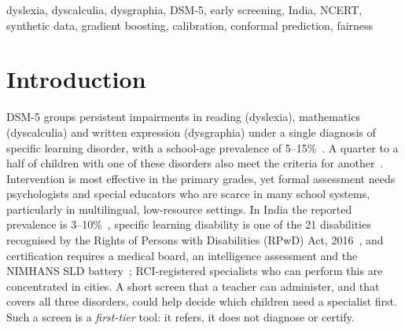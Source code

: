 \documentclass[conference]{IEEEtran}
\begin{document}
\begin{IEEEkeywords}
dyslexia, dyscalculia, dysgraphia, DSM-5, early screening, India, NCERT, synthetic data, gradient boosting, calibration, conformal prediction, fairness
\end{IEEEkeywords}

\section{Introduction}
DSM-5 groups persistent impairments in reading (dyslexia), mathematics (dyscalculia) and written expression (dysgraphia) under a single diagnosis of specific learning disorder, with a school-age prevalence of 5--15\%~\cite{dsm5}. A quarter to a half of children with one of these disorders also meet the criteria for another~\cite{willcutt2013}. Intervention is most effective in the primary grades, yet formal assessment needs psychologists and special educators who are scarce in many school systems, particularly in multilingual, low-resource settings. In India the reported prevalence is 3--10\%~\cite{shah2019ips}, specific learning disability is one of the 21 disabilities recognised by the Rights of Persons with Disabilities (RPwD) Act, 2016~\cite{rpwd2016}, and certification requires a medical board, an intelligence assessment and the NIMHANS SLD battery~\cite{depwd2018}; RCI-registered specialists who can perform this are concentrated in cities. A short screen that a teacher can administer, and that covers all three disorders, could help decide which children need a specialist first. Such a screen is a \emph{first-tier} tool: it refers, it does not diagnose or certify.
\end{document}
